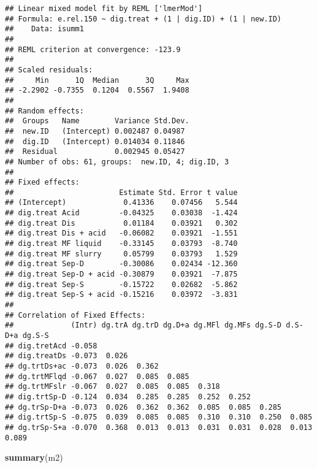\documentclass[
]{article}
\newenvironment{Shaded}{\begin{snugshade}}{\end{snugshade}}
\newcommand{\FunctionTok}[1]{\textcolor[rgb]{0.13,0.29,0.53}{\textbf{#1}}}
\newcommand{\NormalTok}[1]{#1}
\begin{document}
\begin{verbatim}
## Linear mixed model fit by REML ['lmerMod']
## Formula: e.rel.150 ~ dig.treat + (1 | dig.ID) + (1 | new.ID)
##    Data: isumm1
## 
## REML criterion at convergence: -123.9
## 
## Scaled residuals: 
##     Min      1Q  Median      3Q     Max 
## -2.2902 -0.7355  0.1204  0.5567  1.9408 
## 
## Random effects:
##  Groups   Name        Variance Std.Dev.
##  new.ID   (Intercept) 0.002487 0.04987 
##  dig.ID   (Intercept) 0.014034 0.11846 
##  Residual             0.002945 0.05427 
## Number of obs: 61, groups:  new.ID, 4; dig.ID, 3
## 
## Fixed effects:
##                        Estimate Std. Error t value
## (Intercept)             0.41336    0.07456   5.544
## dig.treat Acid         -0.04325    0.03038  -1.424
## dig.treat Dis           0.01184    0.03921   0.302
## dig.treat Dis + acid   -0.06082    0.03921  -1.551
## dig.treat MF liquid    -0.33145    0.03793  -8.740
## dig.treat MF slurry     0.05799    0.03793   1.529
## dig.treat Sep-D        -0.30086    0.02434 -12.360
## dig.treat Sep-D + acid -0.30879    0.03921  -7.875
## dig.treat Sep-S        -0.15722    0.02682  -5.862
## dig.treat Sep-S + acid -0.15216    0.03972  -3.831
## 
## Correlation of Fixed Effects:
##             (Intr) dg.trA dg.trD dg.D+a dg.MFl dg.MFs dg.S-D d.S-D+a dg.S-S
## dig.tretAcd -0.058                                                         
## dig.treatDs -0.073  0.026                                                  
## dg.trtDs+ac -0.073  0.026  0.362                                           
## dg.trtMFlqd -0.067  0.027  0.085  0.085                                    
## dg.trtMFslr -0.067  0.027  0.085  0.085  0.318                             
## dig.trtSp-D -0.124  0.034  0.285  0.285  0.252  0.252                      
## dg.trSp-D+a -0.073  0.026  0.362  0.362  0.085  0.085  0.285               
## dig.trtSp-S -0.075  0.039  0.085  0.085  0.310  0.310  0.250  0.085        
## dg.trSp-S+a -0.070  0.368  0.013  0.013  0.031  0.031  0.028  0.013   0.089
\end{verbatim}

\begin{Shaded}
\begin{Highlighting}[]
\FunctionTok{summary}\NormalTok{(m2)}
\end{Highlighting}
\end{Shaded}
\end{document}
